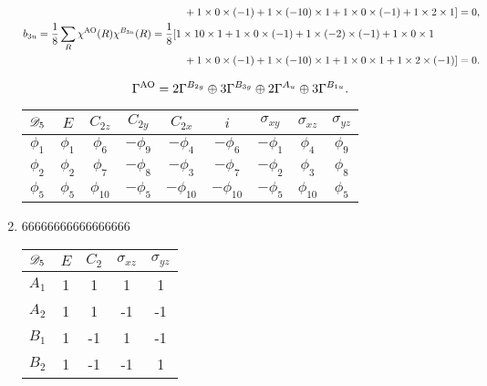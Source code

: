 \documentclass[a4paper]{book}
\newcommand{\AO}{{\rm AO}}
\begin{document}
\begin{solution}
\begin{enumerate}[label=(\alph*)]
\begin{align*}
		 	&\hspace{14em}+ 1 \times 0 \times (-1) + 1 \times (-10) \times 1 + 1 \times 0 \times (-1) + 1 \times 2 \times 1 ] = 0,	\\
		 	b_{3u} &= \frac{1}{8} \sum_{R} \chi^{\AO}(R) \chi^{B_{3u}}(R) = \frac{1}{8} [ 1 \times 10 \times 1 + 1 \times 0 \times (-1) + 1 \times (-2) \times (-1) + 1 \times 0 \times 1 \\
		 	&\hspace{14em}+ 1 \times 0 \times (-1) + 1 \times (-10) \times 1 + 1 \times 0 \times 1 + 1 \times 2 \times (-1) ] = 0.
		\end{align*}
		
		\begin{equation*}
			\Gamma^{\AO} = 2\Gamma^{B_{2g}} \oplus 3\Gamma^{B_{3g}} \oplus 2\Gamma^{A_u} \oplus 3\Gamma^{B_{1u}}.
		\end{equation*}
		
		\begin{center}
		\begin{tabular}{ccccccccc}\hline
	$\mathscr{D}_{\rm 5}$ & $E$ & $C_{2z}$ & $C_{2y}$ & $C_{2x}$	&	$i$	&	$\sigma_{xy}$ &	$\sigma_{xz}$	&	$\sigma_{yz}$\\ \hline
			$\phi_1$	&	$\phi_1$	&	$\phi_6$	&	$-\phi_9$	&	$-\phi_4$	&	$-\phi_6$	&	$-\phi_1$	&	$\phi_4$	&	$\phi_9$		\\
			$\phi_2$	&	$\phi_2$	&	$\phi_7$	&	$-\phi_8$	&	$-\phi_3$	&	$-\phi_7$	&	$-\phi_2$	&	$\phi_3$	&	$\phi_8$		\\ 
			$\phi_5$	&	$\phi_5$	&	$\phi_{10}$	&	$-\phi_5$	&	$-\phi_{10}$	&	$-\phi_{10}$	&	$-\phi_5$	&	$\phi_{10}$	&	$\phi_5$		\\\hline
		\end{tabular}
		\end{center}
		
		
		
		\item 66666666666666666
		
		\begin{center}
		\begin{tabular}{ccccc}\hline
	$\mathscr{D}_{\rm 5}$ & $E$ & $C_2$ &	$\sigma_{xz}$	& $\sigma_{yz}$\\ \hline
			$A_1$	&	1	&	1	&	1	&	1	\\
			$A_2$	&	1	&	1	&	-1	&	-1	\\
			$B_1$ 	&	1	&	-1	&	1	&	-1	\\
			$B_2$ 	&	1	&	-1	&	-1	&	1	\\ \hline
		\end{tabular}
		\end{center}
		

\end{enumerate}
\end{solution}
\end{document}
